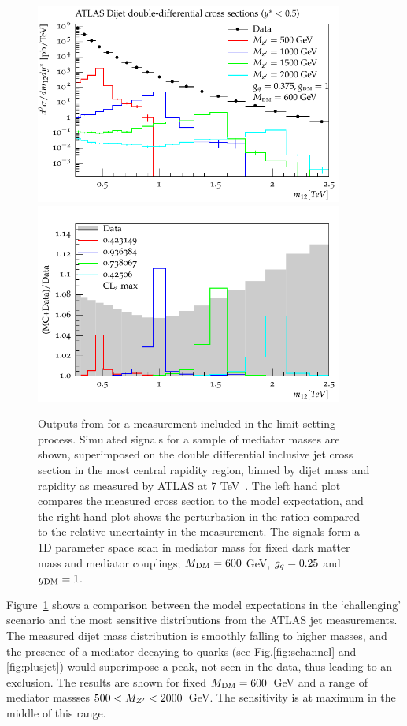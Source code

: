 \documentclass[floatfix]{article}
\begin{document}
\begin{figure}[htb]
\centering
      \includegraphics[width=0.9\textwidth]{images/atlasdijet/fullscale/ATLAS_dijet.pdf}\\
      \includegraphics[width=0.9\textwidth]{images/atlasdijet/ratio/ATLAS_dijet_ratio.pdf}
    \caption{ Outputs from \rivet for a measurement included in the limit setting process. Simulated signals for a sample of mediator masses are shown, superimposed 
on the double differential inclusive jet cross section in the most central rapidity region, binned by dijet mass and rapidity as measured by ATLAS at 
7 TeV~\cite{Aad:2014pua}. The left hand plot compares the measured cross section to the model expectation, and the right hand plot shows the perturbation 
in the ration compared to the relative uncertainty in the measurement. 
The signals form a 1D parameter space scan in mediator mass for fixed dark matter mass and mediator couplings; $M_{\rm DM}=600$ GeV, 
$g_{q}=0.25$ and $g_{\rm DM} = 1$.}
\label{fig:ATLASdijet}
\end{figure}

Figure~\ref{fig:ATLASdijet} shows a comparison between the model expectations in the `challenging' scenario and the most sensitive distributions from the ATLAS jet measurements. The measured dijet mass distribution is smoothly falling to higher masses, and the presence of a mediator decaying to quarks 
(see Fig.\ref{fig:schannel} and \ref{fig:plusjet}) would superimpose a
peak, not seen in the data, thus leading to an exclusion. The results are shown for fixed $M_{\rm DM} = 600$~GeV and a range of mediator massses $500 < M_{Z^{\prime}} < 2000$~GeV. 
The sensitivity is at maximum in the middle of this range.
\end{document}
